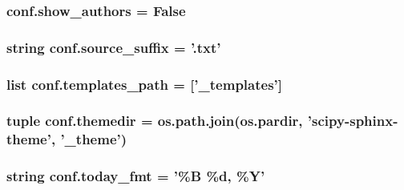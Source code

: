 \subsubsection[{show\+\_\+authors}]{\setlength{\rightskip}{0pt plus 5cm}conf.\+show\+\_\+authors = {\bf False}}\label{namespaceconf_a8ad36ea49cb7ae6ec9f6f3a7e9deaa0e}
\hypertarget{namespaceconf_a1e0ba7f4cb1d50fa831f1236a77d60f6}{}
\subsubsection[{source\+\_\+suffix}]{\setlength{\rightskip}{0pt plus 5cm}string conf.\+source\+\_\+suffix = '.txt'}\label{namespaceconf_a1e0ba7f4cb1d50fa831f1236a77d60f6}
\hypertarget{namespaceconf_af50129dcc1f90655539f025595a3093b}{}
\subsubsection[{templates\+\_\+path}]{\setlength{\rightskip}{0pt plus 5cm}list conf.\+templates\+\_\+path = \mbox{[}'\+\_\+templates'\mbox{]}}\label{namespaceconf_af50129dcc1f90655539f025595a3093b}
\hypertarget{namespaceconf_a3982c0155434954df650226c6d832521}{}
\subsubsection[{themedir}]{\setlength{\rightskip}{0pt plus 5cm}tuple conf.\+themedir = os.\+path.\+join(os.\+pardir, 'scipy-\/sphinx-\/theme', '\+\_\+theme')}\label{namespaceconf_a3982c0155434954df650226c6d832521}
\hypertarget{namespaceconf_a17aebe18c0db0c8d1c4017c0b563c934}{}
\subsubsection[{today\+\_\+fmt}]{\setlength{\rightskip}{0pt plus 5cm}string conf.\+today\+\_\+fmt = '\%B \%d, \%Y'}\label{namespaceconf_a17aebe18c0db0c8d1c4017c0b563c934}
\hypertarget{namespaceconf_a5f8d625775786514c1bd1cd7a6650d69}{}
